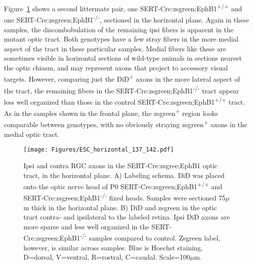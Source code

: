 Figure~\ref{ESChorizontal} shows a second littermate pair, one SERT-Cre:zsgreen;EphB1\textsuperscript{+/+} and one SERT-Cre:zsgreen;EphB1\textsuperscript{-/-}, sectioned in the horizontal plane.
Again in these samples, the discombobulation of the remaining ipsi fibers is apparent in the mutant optic tract.
Both genotypes have a few stray fibers in the more medial aspect of the tract in these particular samples.
Medial fibers like these are sometimes visible in horizontal sections of wild-type animals in sections nearest the optic chiasm, and may represent axons that project to accessory visual targets.
However, comparing just the DiD\textsuperscript{+} axons in the more lateral aspect of the tract, the remaining fibers in the SERT-Cre:zsgreen;EphB1\textsuperscript{-/-} tract appear less well organized than those in the control SERT-Cre:zsgreen;EphB1\textsuperscript{+/+} tract.
As in the samples shown in the frontal plane, the zsgreen\textsuperscript{+} region looks comparable between genotypes, with no obviously straying zsgreen\textsuperscript{+} axons in the medial optic tract.
\begin{figure}[hbtp]
    \begin{center}
        \texttt{[image: Figures/ESC\_horizontal\_137\_142.pdf]}
        \caption[Ipsi and contra RGC axons in the SERT-Cre:zsgree;EphB1 optic tract, in the horizontal plane.]
        {Ipsi and contra RGC axons in the SERT-Cre:zsgree;EphB1 optic tract, in the horizontal plane.
		A) Labeling schema.
		DiD was placed onto the optic nerve head of P0 SERT-Cre:zsgreen;EphB1\textsuperscript{+/+} and SERT-Cre:zsgreen;EphB1\textsuperscript{-/-} fixed heads.
		Samples were sectioned 75$\mu$m thick in the horizontal plane.
		B) DiD and zsgreen in the optic tract contra- and ipsilateral to the labeled retina.
		Ipsi DiD axons are more sparse and less well organized in the SERT-Cre:zsgreen;EphB1\textsuperscript{-/-} samples compared to control.
		Zsgreen label, however, is similar across samples.
		Blue is Hoechst staining.
		D=dorsal, V=ventral, R=rostral, C=caudal.
		Scale=100$\mu$m.}
        \label{ESChorizontal}
    \end{center}
\end{figure}

